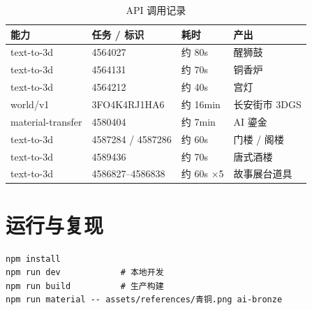 \documentclass[UTF8,a4paper,11pt]{ctexart}
\begin{document}
\begin{table}[H]
\centering
\small
\caption{API 调用记录}
\begin{tabular}{@{}llll@{}}
\toprule
能力 & 任务 / 标识 & 耗时 & 产出 \\
\midrule
text-to-3d & 4564027 & 约 80s & 醒狮鼓 \\
text-to-3d & 4564131 & 约 70s & 铜香炉 \\
text-to-3d & 4564212 & 约 40s & 宫灯 \\
world/v1 & 3FO4K4RJ1HA6 & 约 16min & 长安街市 3DGS \\
material-transfer & 4580404 & 约 7min & AI 鎏金 \\
text-to-3d & 4587284 / 4587286 & 约 60s & 门楼 / 阁楼 \\
text-to-3d & 4589436 & 约 70s & 唐式酒楼 \\
text-to-3d & 4586827--4586838 & 约 60s ×5 & 故事展台道具 \\

\bottomrule
\end{tabular}
\end{table}

\section{运行与复现}

\begin{lstlisting}
npm install
npm run dev            # 本地开发
npm run build          # 生产构建
npm run material -- assets/references/青铜.png ai-bronze
\end{lstlisting}
\end{document}
